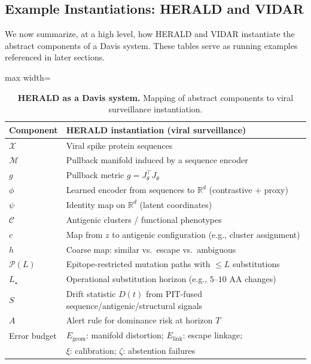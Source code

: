 \documentclass[11pt]{article}
\theoremstyle{remark}
\theoremstyle{plain}
\begin{document}
\subsection{Example Instantiations: HERALD and VIDAR}
\label{subsec:instantiations}

We now summarize, at a high level, how HERALD and VIDAR instantiate the abstract
components of a Davis system. These tables serve as running examples referenced in later sections.

\begin{table}[t]
    \centering
    \begin{adjustbox}{max width=\linewidth}
    \begin{tabular}{ll}
        \toprule
        Component & HERALD instantiation (viral surveillance) \\
        \midrule
        $\mathcal{X}$ & Viral spike protein sequences \\
        $\mathcal{M}$ & Pullback manifold induced by a sequence encoder \\
        $g$ & Pullback metric $g = J_\theta^\top J_\theta$ \\
        $\phi$ & Learned encoder from sequences to $\mathbb{R}^d$ (contrastive + proxy) \\
        $\psi$ & Identity map on $\mathbb{R}^d$ (latent coordinates) \\
        $\mathcal{C}$ & Antigenic clusters / functional phenotypes \\
        $c$ & Map from $z$ to antigenic configuration (e.g., cluster assignment) \\
        $h$ & Coarse map: similar vs.\ escape vs.\ ambiguous \\
        $\mathcal{P}(L)$ & Epitope-restricted mutation paths with $\le L$ substitutions \\
        $L_\star$ & Operational substitution horizon (e.g., $5$--$10$ AA changes) \\
        $S$ & Drift statistic $D(t)$ from PIT-fused sequence/antigenic/structural signals \\
        $A$ & Alert rule for dominance risk at horizon $T$ \\
        Error budget & $E_{\text{geom}}$: manifold distortion; $E_{\text{link}}$: escape linkage; \\
                     & $\xi$: calibration; $\zeta$: abstention failures \\
        \bottomrule
    \end{tabular}
    \end{adjustbox}
    \caption{\textbf{HERALD as a Davis system.} Mapping of abstract components to viral
    surveillance instantiation.}
    \label{tab:herald-davis}
\end{table}
\end{document}

